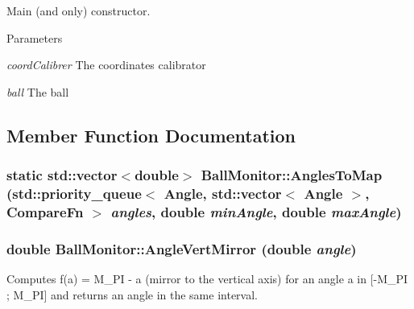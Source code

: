 Main (and only) constructor. 


\begin{DoxyParams}{Parameters}
\item[{\em coordCalibrer}]The coordinates calibrator \item[{\em ball}]The ball \end{DoxyParams}


\subsection{Member Function Documentation}
\hypertarget{classBallMonitor_a8f3198b6b4ef8eb52c0ff04afd33cc8f}{
\subsubsection[{AnglesToMap}]{\setlength{\rightskip}{0pt plus 5cm}static std::vector$<$double$>$ BallMonitor::AnglesToMap (std::priority\_\-queue$<$ {\bf Angle}, std::vector$<$ {\bf Angle} $>$, {\bf CompareFn} $>$ {\em angles}, \/  double {\em minAngle}, \/  double {\em maxAngle})}}
\label{classBallMonitor_a8f3198b6b4ef8eb52c0ff04afd33cc8f}
\hypertarget{classBallMonitor_a32d7b6d877b84c7d7fd9bc9ffe659562}{
\subsubsection[{AngleVertMirror}]{\setlength{\rightskip}{0pt plus 5cm}double BallMonitor::AngleVertMirror (double {\em angle})}}
\label{classBallMonitor_a32d7b6d877b84c7d7fd9bc9ffe659562}


Computes f(a) = M\_\-PI -\/ a (mirror to the vertical axis) for an angle a in \mbox{[}-\/M\_\-PI ; M\_\-PI\mbox{]} and returns an angle in the same interval. 


